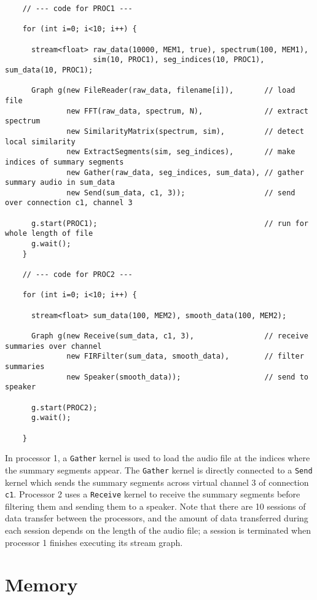 {\small
\begin{verbatim}
    // --- code for PROC1 ---

    for (int i=0; i<10; i++) {

      stream<float> raw_data(10000, MEM1, true), spectrum(100, MEM1),
                    sim(10, PROC1), seg_indices(10, PROC1), sum_data(10, PROC1);

      Graph g(new FileReader(raw_data, filename[i]),       // load file
              new FFT(raw_data, spectrum, N),              // extract spectrum
              new SimilarityMatrix(spectrum, sim),         // detect local similarity
              new ExtractSegments(sim, seg_indices),       // make indices of summary segments
              new Gather(raw_data, seg_indices, sum_data), // gather summary audio in sum_data
              new Send(sum_data, c1, 3));                  // send over connection c1, channel 3

      g.start(PROC1);                                      // run for whole length of file
      g.wait();
    }

    // --- code for PROC2 ---

    for (int i=0; i<10; i++) {

      stream<float> sum_data(100, MEM2), smooth_data(100, MEM2);

      Graph g(new Receive(sum_data, c1, 3),                // receive summaries over channel
              new FIRFilter(sum_data, smooth_data),        // filter summaries
              new Speaker(smooth_data));                   // send to speaker

      g.start(PROC2);
      g.wait();

    }   
\end{verbatim}}
In processor 1, a {\tt Gather} kernel is used to load the audio file
at the indices where the summary segments appear.  The {\tt Gather}
kernel is directly connected to a {\tt Send} kernel which sends the
summary segments across virtual channel 3 of connection {\tt c1}.
Processor 2 uses a {\tt Receive} kernel to receive the summary
segments before filtering them and sending them to a speaker.  Note
that there are 10 sessions of data transfer between the processors,
and the amount of data transferred during each session depends on the
length of the audio file; a session is terminated when processor 1
finishes executing its stream graph.

\section{Memory}

